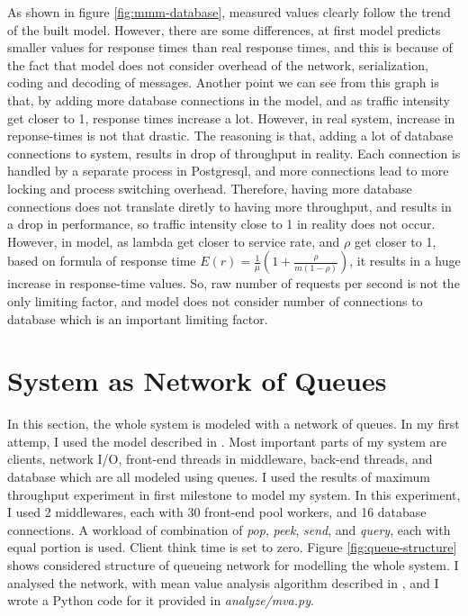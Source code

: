 \documentclass[11pt]{article}
\begin{document}
As shown in figure \ref{fig:mmm-database}, measured values clearly follow the trend of the built model.
However, there are some differences, at first model predicts smaller values for response times 
than real response times, and this is because of the fact that model does not consider overhead 
of the network, serialization, coding and decoding of messages.
Another point we can see from this graph is that, by adding more database connections in the model, 
and as traffic intensity get closer to 1,  response times increase a lot. However, in real 
system, increase in reponse-times is not that drastic. The reasoning is that, 
adding a lot of database connections to system, results in drop of throughput in reality.
Each connection is handled by a separate process in Postgresql, and more 
connections lead to more locking and process switching overhead. Therefore, having more database 
connections does not translate diretly to having more throughput, and results in a drop 
in performance, so traffic intensity close to 1 in reality does not occur. However, 
in model, as lambda get closer to service rate, and $\rho$ get closer to 1, 
based on formula of response time $E(r)=\frac{1}{\mu}(1+\frac{\rho}{m(1-\rho)})$, it results in a huge 
increase in response-time values. So, raw number of requests per second is not the only limiting factor, 
and model does not consider number of connections to database which is an important 
limiting factor. 

\section{System as Network of Queues}\label{sec:network-of-queues}

In this section, the whole system is modeled with a network of queues. In my
first attemp, I used the model described in \cite[section~34.2]{book}. 
Most important parts of my system are clients, network I/O, front-end threads in middleware, 
back-end threads, and database which are all modeled using queues. I used the results of 
maximum throughput experiment in first milestone to model my system. In this experiment, 
I used 2 middlewares, each with 30 front-end pool workers, and 16 database connections. 
A workload of combination of \emph{pop}, \emph{peek}, \emph{send}, and \emph{query}, each with 
equal portion is used. Client think time is set to zero. Figure \ref{fig:queue-structure} shows considered structure of queueing network for modelling the whole 
system. I analysed the network, with mean value analysis algorithm described in \cite[section~34.2]{book}, and I wrote 
a Python code for it provided in \emph{analyze/mva.py}.
\end{document}
